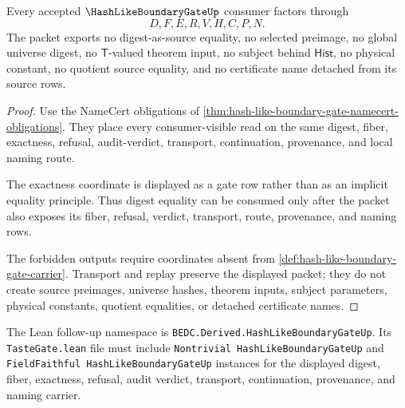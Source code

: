 \begin{theorem}
\label{thm:hash-like-boundary-gate-nonescape}
Every accepted $\HashLikeBoundaryGateUp$ consumer factors through
$$
D,F,E,R,V,H,C,P,N.
$$
The packet exports no digest-as-source equality, no selected preimage, no global universe digest, no $\mathsf{T}$-valued theorem input, no subject behind $\mathsf{Hist}$, no physical constant, no quotient source equality, and no certificate name detached from its source rows.
\end{theorem}
\begin{proof}
Use the NameCert obligations of \autoref{thm:hash-like-boundary-gate-namecert-obligations}. They place every consumer-visible read on the same digest, fiber, exactness, refusal, audit-verdict, transport, continuation, provenance, and local naming route.

The exactness coordinate is displayed as a gate row rather than as an implicit equality principle. Thus digest equality can be consumed only after the packet also exposes its fiber, refusal, verdict, transport, route, provenance, and naming rows.

The forbidden outputs require coordinates absent from \autoref{def:hash-like-boundary-gate-carrier}. Transport and replay preserve the displayed packet; they do not create source preimages, universe hashes, theorem inputs, subject parameters, physical constants, quotient equalities, or detached certificate names.
\end{proof}



The Lean follow-up namespace is \texttt{BEDC.Derived.HashLikeBoundaryGateUp}. Its \texttt{TasteGate.lean} file must include \texttt{Nontrivial HashLikeBoundaryGateUp} and \texttt{FieldFaithful HashLikeBoundaryGateUp} instances for the displayed digest, fiber, exactness, refusal, audit verdict, transport, continuation, provenance, and naming carrier.

